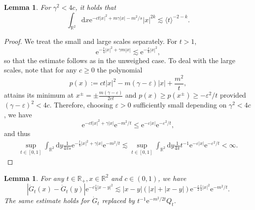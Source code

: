 \documentclass[11pt, a4paper]{scrartcl}
\numberwithin{equation}{section}
\theoremstyle{plain}
\newtheorem{lemma}[foo]{Lemma}
\theoremstyle{remark}
\newcommand{\assign}{:=}
\newcommand{\mathd}{\mathrm{d}}
\newcommand{\mathe}{\mathrm{e}}
\begin{document}
\begin{lemma}
  \label{lem:exp-integrability}For $\gamma^2 < 4 c$, it holds that
  \[ \int_{\mathbb{R}^2} \mathd x \mathe^{- ct | x |^2 + m \gamma | x | - m^2
     / s} | x |^{2 k} \lesssim \langle t \rangle^{- 2 - k} . \]
\end{lemma}

\begin{proof}
  We treat the small and large scales separately. For $t > 1$,
  \[ \mathe^{- \frac{t}{4} | x |^2 + \gamma m | x |} \lesssim \mathe^{-
     \frac{t}{8} | x |^2}, \]
  so that the estimate follows as in the unweighed case. To deal with the
  large scales, note that for any $c \geqslant 0$ the polynomial
  \[ p (x) \assign ct | x |^2 - m (\gamma - \varepsilon) | x | +
     \frac{m^2}{t}, \]
  attains its minimum at $x^{\pm} = \pm \frac{m (\gamma - \varepsilon)}{2
  ct}$ and $p (x) \geqslant p (x^{\pm}) \geqslant - \varepsilon^2 / t$
  provided $(\gamma - \varepsilon)^2 < 4 c$. Therefore, choosing $\varepsilon
  > 0$ sufficiently small depending on $\gamma^2 < 4 c$, we have \[\mathe^{- ct
  | x |^2 + \gamma | x |} \mathe^{- m^2 / t} \leqslant \mathe^{- \varepsilon |
  x |} \mathe^{- \varepsilon^2 / t},\] and thus
  \[ \begin{aligned}
       \sup_{t \in [0, 1]}  \int_{\mathbb{R}^2} \mathd y \frac{1}{4 \pi s}
       \mathe^{- \frac{t}{4} | x |^2 + \gamma | x |} \mathe^{- m^2 / t}
       \lesssim \sup_{t \in [0, 1]}  \int_{\mathbb{R}^2} \mathd y \frac{1}{4
       \pi} t^{- 1} \mathe^{- \varepsilon | x |} \mathe^{- \varepsilon^2 / t}
       < \infty .
     \end{aligned} \]
\end{proof}

\begin{lemma}
  \label{lem:hk-weighted-Lipschitz}For any $t \in \mathbb{R}_+, x \in
  \mathbb{R}^2$ and $c \in (0,1)$, we have
  \[ | \dot{G}_t (x) - \dot{G}_t (y) | \mathe^{- c \frac{t}{4}| x - y |^2} \lesssim | x -
     y | (| x | + | x - y |) \mathe^{- \frac{c}{2} \frac{t}{4}| x |^2} \mathe^{- m^2 / t}
     . \]
  The same estimate holds for $\dot{G}_t$ replaced by $t^{- 1} \mathe^{- m^2 /
  2 t} Q_t$.
\end{lemma}
\end{document}
